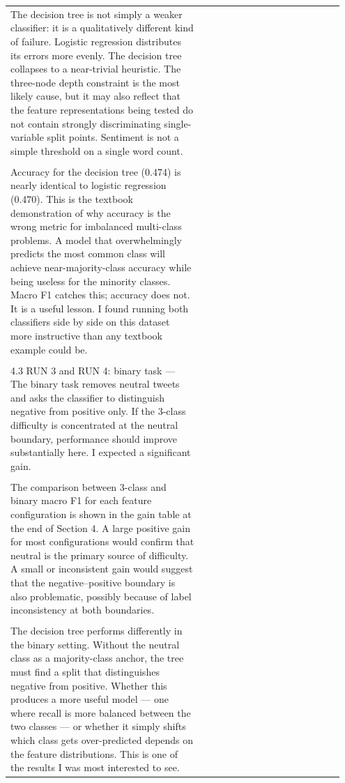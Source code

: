 \documentclass[11pt]{article}
\begin{document}
\begin{longtable}{|p{0.55\linewidth}|p{0.40\linewidth}|}
\hline
\rule{0pt}{3.5cm} & \\
\hline
The decision tree is not simply a weaker classifier: it is a qualitatively different kind of failure. Logistic regression distributes its errors more evenly. The decision tree collapses to a near-trivial heuristic. The three-node depth constraint is the most likely cause, but it may also reflect that the feature representations being tested do not contain strongly discriminating single-variable split points. Sentiment is not a simple threshold on a single word count. & \\[2pt]
\hline
\rule{0pt}{3.5cm} & \\
\hline
Accuracy for the decision tree (0.474) is nearly identical to logistic regression (0.470). This is the textbook demonstration of why accuracy is the wrong metric for imbalanced multi-class problems. A model that overwhelmingly predicts the most common class will achieve near-majority-class accuracy while being useless for the minority classes. Macro F1 catches this; accuracy does not. It is a useful lesson. I found running both classifiers side by side on this dataset more instructive than any textbook example could be. & \\[2pt]
\hline
\rule{0pt}{3.5cm} & \\
\hline
4.3 RUN 3 and RUN 4: binary task --- The binary task removes neutral tweets and asks the classifier to distinguish negative from positive only. If the 3-class difficulty is concentrated at the neutral boundary, performance should improve substantially here. I expected a significant gain. & \\[2pt]
\hline
\rule{0pt}{3.5cm} & \\
\hline
The comparison between 3-class and binary macro F1 for each feature configuration is shown in the gain table at the end of Section 4. A large positive gain for most configurations would confirm that neutral is the primary source of difficulty. A small or inconsistent gain would suggest that the negative--positive boundary is also problematic, possibly because of label inconsistency at both boundaries. & \\[2pt]
\hline
\rule{0pt}{3.5cm} & \\
\hline
The decision tree performs differently in the binary setting. Without the neutral class as a majority-class anchor, the tree must find a split that distinguishes negative from positive. Whether this produces a more useful model --- one where recall is more balanced between the two classes --- or whether it simply shifts which class gets over-predicted depends on the feature distributions. This is one of the results I was most interested to see. & \\[2pt]

\end{longtable}
\end{document}
